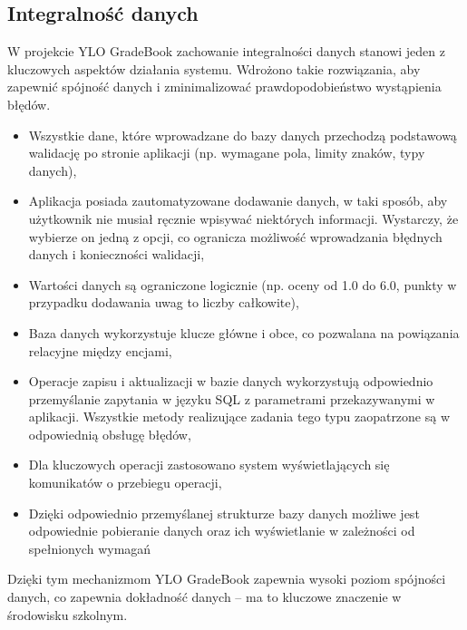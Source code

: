 \subsection{Integralność danych}
\label{integralnośćDanych}
W projekcie YLO GradeBook zachowanie integralności danych stanowi jeden z kluczowych aspektów działania systemu. Wdrożono takie rozwiązania, aby zapewnić spójność danych i zminimalizować prawdopodobieństwo wystąpienia błędów.
\begin{itemize}
      \item Wszystkie dane, które wprowadzane do bazy danych przechodzą podstawową walidację po stronie aplikacji (np. wymagane pola, limity znaków, typy danych),
      \item Aplikacja posiada zautomatyzowane dodawanie danych, w taki sposób, aby użytkownik nie musiał ręcznie wpisywać niektórych informacji. Wystarczy, że wybierze on jedną z opcji, co ogranicza możliwość wprowadzania błędnych danych i konieczności walidacji,
      \item Wartości danych są ograniczone logicznie (np. oceny od 1.0 do 6.0, punkty w przypadku dodawania uwag to liczby całkowite),
      \item Baza danych wykorzystuje klucze główne i obce, co pozwalana na powiązania relacyjne między encjami,
      \item Operacje zapisu i aktualizacji w bazie danych wykorzystują odpowiednio przemyślanie zapytania w języku SQL z parametrami przekazywanymi w aplikacji. Wszystkie metody realizujące zadania tego typu zaopatrzone są w odpowiednią obsługę błędów,
      \item Dla kluczowych operacji zastosowano system wyświetlających się komunikatów o przebiegu operacji,
      \item Dzięki odpowiednio przemyślanej strukturze bazy danych możliwe jest odpowiednie pobieranie danych oraz ich wyświetlanie w zależności od spełnionych wymagań

\end{itemize}
Dzięki tym mechanizmom YLO GradeBook zapewnia wysoki poziom spójności danych, co zapewnia dokładność danych – ma to kluczowe znaczenie w środowisku szkolnym.





